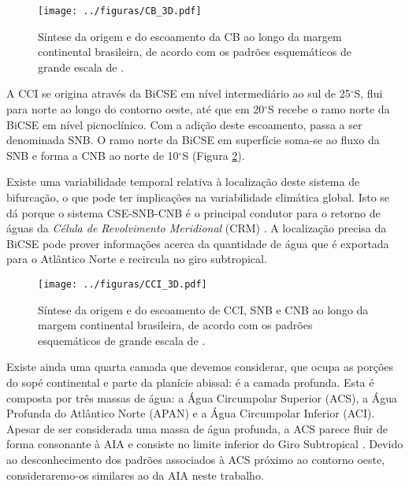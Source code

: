 \begin{figure}%
 \begin{center}
  \texttt{[image: ../figuras/CB\_3D.pdf]}
 \end{center}
 \vspace{-.5cm}
 \renewcommand{\baselinestretch}{1}
 \caption{\label{fig:CB_3D} \small Síntese da origem e do escoamento da CB ao longo 
da margem continental brasileira, de acordo com os padrões esquemáticos de grande escala de \cite{stramma_england1999}.}
\end{figure}

A CCI se origina através da BiCSE em nível intermediário ao sul de 25$^\circ$S, flui para norte ao longo do contorno oeste, 
até que em 20$^\circ$S recebe o ramo norte da BiCSE em nível picnoclínico. Com a adição deste escoamento, 
passa a ser denominada SNB.
O ramo norte da BiCSE em superfície soma-se ao fluxo da SNB e forma a CNB ao norte de 10$^\circ$S (Figura \ref{fig:CCI_3D}). 

Existe uma variabilidade temporal relativa à localização deste sistema de bifurcação, o que
pode ter im\-pli\-ca\-ções na variabilidade climática global. Isto se dá porque 
o sistema CSE-SNB-CNB é o principal condutor para o retorno de águas da {\it Célula de Revolvimento Meridional} (CRM) \citep{talley2003,ganachaud2003,lumpkin_speer2003}. A localização precisa da BiCSE pode prover informações
acerca da quantidade de água que é exportada para o Atlântico Norte e recircula no giro subtropical.

\begin{figure}%
 \begin{center}
  \texttt{[image: ../figuras/CCI\_3D.pdf]}
 \end{center}
 \vspace{-.5cm}
 \renewcommand{\baselinestretch}{1}
 \caption{\label{fig:CCI_3D} \small Síntese da origem e do escoamento de CCI, SNB e CNB ao longo 
da margem continental brasileira, de acordo com os padrões esquemáticos de grande escala de \cite{stramma_england1999}.}
\end{figure}

Existe ainda uma quarta camada que devemos considerar, que ocupa as porções do sopé continental
e parte da planície abissal: é a camada profunda. Esta é composta por três massas de água: 
a Água Circumpolar Superior (ACS), a Água Profunda do Atlântico Norte (APAN) e a Água 
Circumpolar Inferior (ACI). Apesar de ser considerada uma massa de água profunda, a ACS parece
fluir de forma consonante à AIA e consiste no limite inferior do Giro Subtropical 
\citep{stramma_england1999,memery_etal2000}. Devido ao desconhecimento dos padrões associados
à ACS próximo ao contorno oeste, consideraremo-os similares ao da AIA neste trabalho. 

